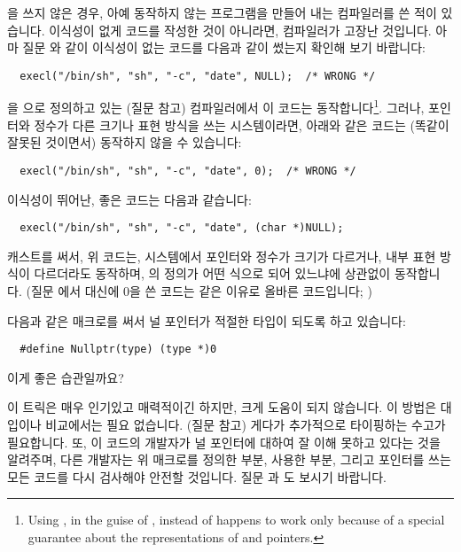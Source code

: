 \begin{faq}
	을 쓰지 않은 경우, 아예 동작하지 않는 프로그램을 만들어
	내는 컴파일러를 쓴 적이 있습니다.
\A
	이식성이 없게 코드를 작성한 것이 아니라면, 컴파일러가 고장난 것입니다.
	아마 질문 와 같이 이식성이 없는 코드를 다음과 같이 썼는지 확인해
	보기 바랍니다:
\begin{verbatim}
  execl("/bin/sh", "sh", "-c", "date", NULL);  /* WRONG */
\end{verbatim}

	을 으로 정의하고 있는 (질문  참고)
	컴파일러에서 이 코드는 동작합니다\footnote{Using ,
	  in the guise of , instead of  happens
	  to work only because of a special guarantee about the 
	  representations of  and  pointers.}.
	그러나, 포인터와 정수가 다른 크기나 표현 방식을 쓰는 시스템이라면,
	아래와 같은 코드는 (똑같이 잘못된 것이면서) 동작하지 않을 수
	있습니다:

\begin{verbatim}
  execl("/bin/sh", "sh", "-c", "date", 0);  /* WRONG */
\end{verbatim}

	이식성이 뛰어난, 좋은 코드는 다음과 같습니다:
\begin{verbatim}
  execl("/bin/sh", "sh", "-c", "date", (char *)NULL);
\end{verbatim}

	캐스트를 써서, 위 코드는, 시스템에서 포인터와 정수가 크기가 다르거나,
	내부 표현 방식이 다르더라도 동작하며, 의 정의가 어떤 식으로
	되어 있느냐에 상관없이 동작합니다. (질문 에서  대신에
	0을 쓴 코드는 같은 이유로 올바른 코드입니다; )
\end{faq}

  
\begin{faq}
	다음과 같은 매크로를 써서 널 포인터가 적절한 타입이
	되도록 하고 있습니다:
\begin{verbatim}
  #define Nullptr(type) (type *)0
\end{verbatim}
	이게 좋은 습관일까요?

\A
	이 트릭은 매우 인기있고 매력적이긴 하지만, 크게 도움이 되지 않습니다.
	이 방법은 대입이나 비교에서는 필요 없습니다. (질문  참고) 게다가
	추가적으로 타이핑하는 수고가 필요합니다. 또, 이 코드의 개발자가
	널 포인터에 대하여 잘 이해 못하고 있다는 것을 알려주며, 다른 개발자는
	위 매크로를 정의한 부분, 사용한 부분, 그리고 포인터를 쓰는 모든 코드를
	다시 검사해야 안전할 것입니다. 질문
	과 도 보시기 바랍니다.
\end{faq}

